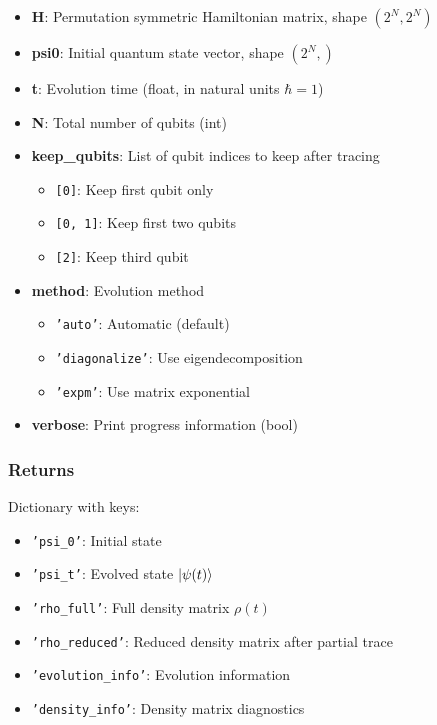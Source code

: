 \documentclass[11pt,a4paper]{article}
\begin{document}
\begin{itemize}
    \item \textbf{H}: Permutation symmetric Hamiltonian matrix, shape $(2^N, 2^N)$
    \item \textbf{psi0}: Initial quantum state vector, shape $(2^N,)$
    \item \textbf{t}: Evolution time (float, in natural units $\hbar = 1$)
    \item \textbf{N}: Total number of qubits (int)
    \item \textbf{keep\_qubits}: List of qubit indices to keep after tracing
        \begin{itemize}
            \item \texttt{[0]}: Keep first qubit only
            \item \texttt{[0, 1]}: Keep first two qubits
            \item \texttt{[2]}: Keep third qubit
        \end{itemize}
    \item \textbf{method}: Evolution method
        \begin{itemize}
            \item \texttt{'auto'}: Automatic (default)
            \item \texttt{'diagonalize'}: Use eigendecomposition
            \item \texttt{'expm'}: Use matrix exponential
        \end{itemize}
    \item \textbf{verbose}: Print progress information (bool)
\end{itemize}

\subsubsection{Returns}

Dictionary with keys:
\begin{itemize}
    \item \texttt{'psi\_0'}: Initial state
    \item \texttt{'psi\_t'}: Evolved state $\ket{\psi(t)}$
    \item \texttt{'rho\_full'}: Full density matrix $\rho(t)$
    \item \texttt{'rho\_reduced'}: Reduced density matrix after partial trace
    \item \texttt{'evolution\_info'}: Evolution information
    \item \texttt{'density\_info'}: Density matrix diagnostics
\end{itemize}
\end{document}
